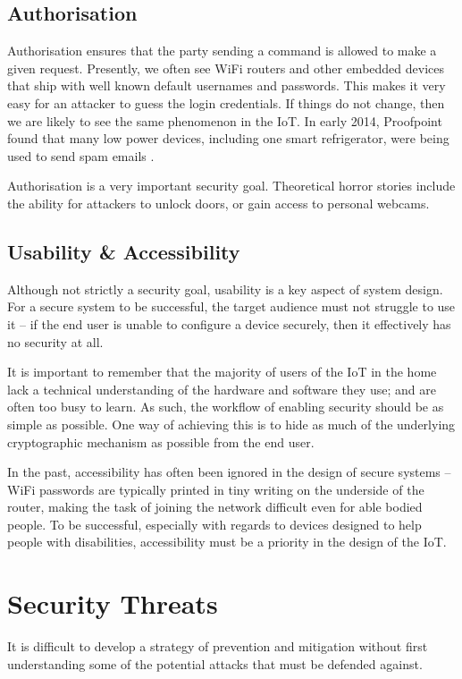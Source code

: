 \documentclass[10pt,journal,compsoc]{IEEEtran}
\begin{document}
\subsection{Authorisation}
Authorisation ensures that the party sending a command is allowed
to make a given request. Presently, we often see WiFi routers
and other embedded devices that ship with well known default usernames
and passwords. This makes it very easy for an attacker to guess the login
credentials. If things do not change, then we are likely to see the same
phenomenon in the IoT. In early 2014, Proofpoint found that many low power
devices, including one smart refrigerator, were being used to send spam emails
\cite{Proofpoint2014}.

Authorisation is a very important security goal. Theoretical horror stories
include the ability for attackers to unlock doors, or gain access to personal
webcams.  

\subsection{Usability \& Accessibility}
Although not strictly a security goal, usability is a key aspect of system
design. For a secure system to be successful, the target audience must not
struggle to use it -- if the end user is unable to configure a device securely,
then it effectively has no security at all.

It is important to remember that the majority of users of the IoT in the home
lack a technical understanding of the hardware and software they use; and are
often too busy to learn. As such, the workflow of enabling security should be
as simple as possible. One way of achieving this is to hide as much of the
underlying cryptographic mechanism as possible from the end user.

In the past, accessibility has often been ignored in the design of secure
systems -- WiFi passwords are typically printed in tiny writing on the
underside of the router, making the task of joining the network difficult even
for able bodied people. To be successful, especially with regards to devices
designed to help people with disabilities, accessibility must be a priority in
the design of the IoT.  


\section{Security Threats}
It is difficult to develop a strategy of prevention and mitigation without
first understanding some of the potential attacks that must be defended
against.  
\end{document}
